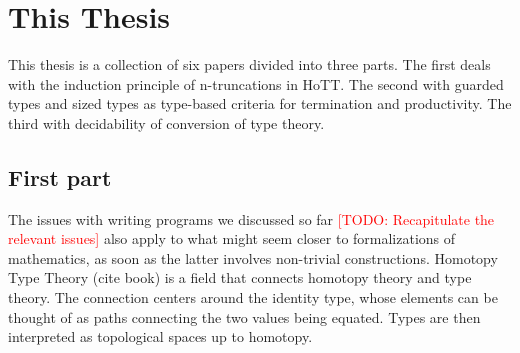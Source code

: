 \documentclass{book}
\newcommand{\TODO}[1]{\textcolor{red}{[TODO: #1]}}
\begin{document}
\section{This Thesis}

This thesis is a collection of six papers divided into three parts.
The first deals with the induction principle of n-truncations in HoTT.
The second with guarded types and sized types as type-based criteria
for termination and productivity. The third with decidability of
conversion of type theory.

\subsection{First part}
The issues with writing programs we discussed so far
\TODO{Recapitulate the relevant issues}
also apply to
what might seem closer to formalizations of mathematics, as soon as the
latter involves non-trivial constructions.
Homotopy Type Theory (cite book) is a field that connects homotopy theory and type theory.
The connection centers around the identity type, whose elements can be
thought of as paths connecting the two values being equated. Types are
then interpreted as topological spaces up to homotopy.
\end{document}
